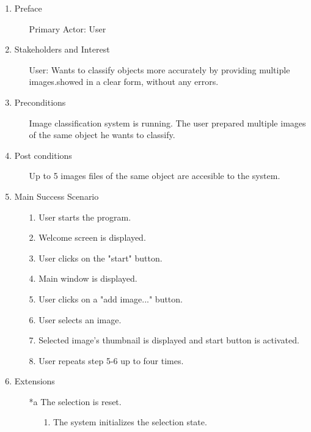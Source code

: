 \documentclass[parskip=full]{scrartcl}
\begin{document}
\begin{enumerate}
	\item Preface
	\begin{itemize} [nosep]
		\item[] Primary Actor: User
	\end{itemize}
	\item Stakeholders and Interest
	\begin{itemize} [nosep]
		\item[] User: Wants to classify objects more accurately by providing multiple images.showed in a clear form, without any errors.
	\end{itemize}
	\item Preconditions
	\begin{itemize} [nosep]
		\item[] Image classification system is running. The user prepared multiple images of the same object he wants to classify.
	\end{itemize}
	\item Post conditions
	\begin{itemize} [nosep]
		\item[] Up to 5 images files of the same object are accesible to the system.
	\end{itemize}
	\item Main Success Scenario
	\begin{itemize} [nosep]
		\item[1.] User starts the program.
		\item[2.] Welcome screen is displayed.
		\item[3.] User clicks on the "start" button.
		\item[4.] Main window is displayed.
		\item[5.] User clicks on a "add image..." button.
		\item[6.] User selects an image.
		\item[7.] Selected image's thumbnail is displayed and start button is activated.
		\item[8.] User repeats step 5-6 up to four times.
	\end{itemize}
	\item Extensions
	\begin{itemize} [nosep]
		\item[*a] The selection is reset.
			\begin{itemize} [nosep]
				\item[1.] The system initializes the selection state.
			\end{itemize}

\end{itemize}
\end{enumerate}
\end{document}
